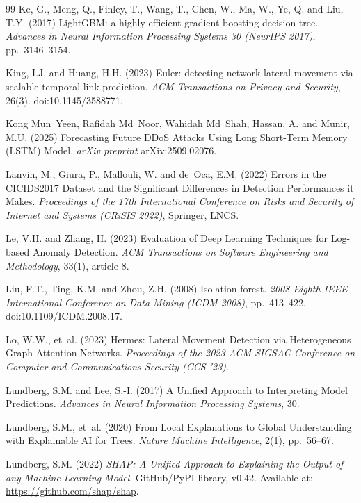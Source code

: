 \documentclass[12pt,a4paper]{report}
\begin{document}
\begin{thebibliography}{99}
Ke, G., Meng, Q., Finley, T., Wang, T., Chen, W., Ma, W., Ye, Q. and Liu, T.Y. (2017) LightGBM: a highly efficient gradient boosting decision tree. \textit{Advances in Neural Information Processing Systems 30 (NeurIPS 2017)}, pp.~3146--3154.

King, I.J. and Huang, H.H. (2023) Euler: detecting network lateral movement via scalable temporal link prediction. \textit{ACM Transactions on Privacy and Security}, 26(3). doi:10.1145/3588771.

Kong Mun~Yeen, Rafidah Md~Noor, Wahidah Md~Shah, Hassan, A. and Munir, M.U. (2025) Forecasting Future DDoS Attacks Using Long Short-Term Memory (LSTM) Model. \textit{arXiv preprint} arXiv:2509.02076.

Lanvin, M., Giura, P., Mallouli, W. and de~Oca, E.M. (2022) Errors in the CICIDS2017 Dataset and the Significant Differences in Detection Performances it Makes. \textit{Proceedings of the 17th International Conference on Risks and Security of Internet and Systems (CRiSIS 2022)}, Springer, LNCS.

Le, V.H. and Zhang, H. (2023) Evaluation of Deep Learning Techniques for Log-based Anomaly Detection. \textit{ACM Transactions on Software Engineering and Methodology}, 33(1), article 8.

Liu, F.T., Ting, K.M. and Zhou, Z.H. (2008) Isolation forest. \textit{2008 Eighth IEEE International Conference on Data Mining (ICDM 2008)}, pp.~413--422. doi:10.1109/ICDM.2008.17.

Lo, W.W., et~al. (2023) Hermes: Lateral Movement Detection via Heterogeneous Graph Attention Networks. \textit{Proceedings of the 2023 ACM SIGSAC Conference on Computer and Communications Security (CCS '23)}.

Lundberg, S.M. and Lee, S.-I. (2017) A Unified Approach to Interpreting Model Predictions. \textit{Advances in Neural Information Processing Systems}, 30.

Lundberg, S.M., et~al. (2020) From Local Explanations to Global Understanding with Explainable AI for Trees. \textit{Nature Machine Intelligence}, 2(1), pp.~56--67.

Lundberg, S.M. (2022) \textit{SHAP: A Unified Approach to Explaining the Output of any Machine Learning Model}. GitHub/PyPI library, v0.42. Available at: \url{https://github.com/shap/shap}.


\end{thebibliography}
\end{document}

